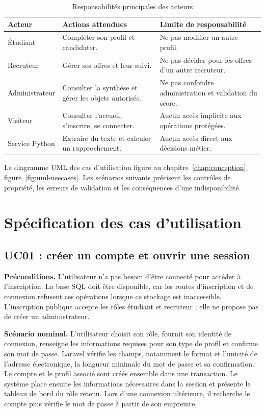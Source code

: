 \begin{table}[htbp]
\centering
\small
\caption{Responsabilités principales des acteurs}
\label{tab:acteurs-besoins}
\begin{tabularx}{\textwidth}{@{}P{0.19\textwidth}XX@{}}
\toprule
Acteur & Actions attendues & Limite de responsabilité \\
\midrule
Étudiant & Compléter son profil et candidater. & Ne pas modifier un autre profil. \\
Recruteur & Gérer ses offres et leur suivi. & Ne pas décider pour les offres d'un autre recruteur. \\
Administrateur & Consulter la synthèse et gérer les objets autorisés. & Ne pas confondre administration et validation du score. \\
Visiteur & Consulter l'accueil, s'inscrire, se connecter. & Aucun accès implicite aux opérations protégées. \\
Service Python & Extraire du texte et calculer un rapprochement. & Aucun accès direct aux décisions métier. \\
\bottomrule
\end{tabularx}
\end{table}

Le diagramme UML des cas d'utilisation figure au chapitre~\ref{chap:conception}, figure~\ref{fig:uml-usecases}. Les scénarios suivants précisent les contrôles de propriété, les erreurs de validation et les conséquences d'une indisponibilité.

\section{Spécification des cas d'utilisation}

\subsection{UC01 : créer un compte et ouvrir une session}

\textbf{Préconditions.} L'utilisateur n'a pas besoin d'être connecté pour accéder à l'inscription. La base SQL doit être disponible, car les routes d'inscription et de connexion refusent ces opérations lorsque ce stockage est inaccessible. L'inscription publique accepte les rôles étudiant et recruteur ; elle ne propose pas de créer un administrateur.

\textbf{Scénario nominal.} L'utilisateur choisit son rôle, fournit son identité de connexion, renseigne les informations requises pour son type de profil et confirme son mot de passe. Laravel vérifie les champs, notamment le format et l'unicité de l'adresse électronique, la longueur minimale du mot de passe et sa confirmation. Le compte et le profil associé sont créés ensemble dans une transaction. Le système place ensuite les informations nécessaires dans la session et présente le tableau de bord du rôle retenu. Lors d'une connexion ultérieure, il recherche le compte puis vérifie le mot de passe à partir de son empreinte.

